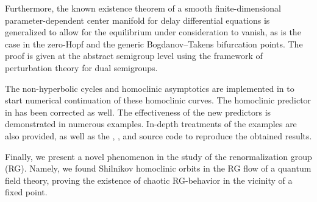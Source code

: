 Furthermore, the known existence theorem of a smooth finite-dimensional
parameter-dependent center manifold for delay differential equations is
generalized to allow for the equilibrium under consideration to vanish, as is
the case in the zero-Hopf and the generic Bogdanov--Takens bifurcation points.
The proof is given at the abstract semigroup level using the framework of
perturbation theory for dual semigroups.

The non-hyperbolic cycles and homoclinic asymptotics are implemented in
\DDEBIFTOOL to start numerical continuation of these homoclinic curves. The
homoclinic predictor in \MATCONT has been corrected as well. The effectiveness of
the new predictors is demonstrated in numerous examples. In-depth treatments of
the examples are also provided, as well as the \MATLAB, \PYTHON, and \JULIA
source code to reproduce the obtained results.

Finally, we present a novel phenomenon in the study of the renormalization group
(RG). Namely, we found Shilnikov homoclinic orbits in the RG flow of a quantum
field theory, proving the existence of chaotic RG-behavior in the vicinity of a
fixed point.
